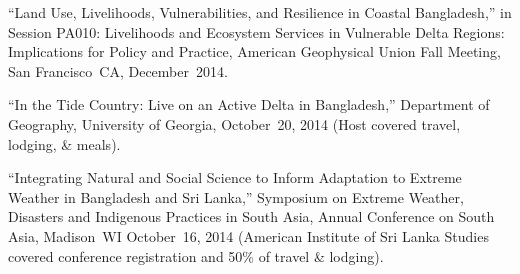 \item ``Land Use, Livelihoods, Vulnerabilities, and Resilience in Coastal Bangladesh,'' in Session PA010: Livelihoods and Ecosystem Services in Vulnerable Delta Regions: Implications for Policy and Practice, American Geophysical Union Fall Meeting, San Francisco~CA, December~2014.
\item ``In the Tide Country: Live on an Active Delta in Bangladesh,'' Department of Geography, University of Georgia, October~20, 2014 (Host covered travel, lodging, \& meals).
\item ``Integrating Natural and Social Science to Inform Adaptation to Extreme Weather in Bangladesh and Sri Lanka,'' Symposium on Extreme Weather, Disasters and Indigenous Practices in South Asia, Annual Conference on South Asia, Madison~WI October~16, 2014 (American Institute of Sri Lanka Studies covered conference registration and 50\% of travel \& lodging).
